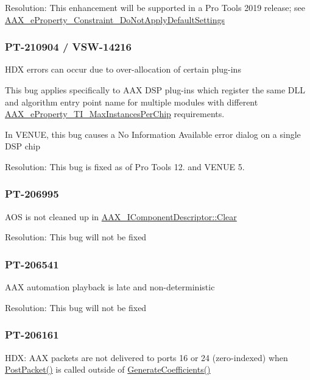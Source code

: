 Resolution\+: This enhancement will be supported in a Pro Tools 2019 release; see \mbox{\hyperlink{a00662_a13e384f22825afd3db6d68395b79ce0da80bb55dbba6cba01120eda8f86284eba}{A\+A\+X\+\_\+e\+Property\+\_\+\+Constraint\+\_\+\+Do\+Not\+Apply\+Default\+Settings}}\hypertarget{a00846_PT-210904}{}\subsubsection{P\+T-\/210904 / V\+S\+W-\/14216}\label{a00846_PT-210904}
H\+DX errors can occur due to over-\/allocation of certain plug-\/ins

This bug applies specifically to A\+AX D\+SP plug-\/ins which register the same D\+LL and algorithm entry point name for multiple modules with different \mbox{\hyperlink{a00662_a13e384f22825afd3db6d68395b79ce0da5b85e213113b7f0f7ee4bac4f5eaa59d}{A\+A\+X\+\_\+e\+Property\+\_\+\+T\+I\+\_\+\+Max\+Instances\+Per\+Chip}} requirements.

In V\+E\+N\+UE, this bug causes a \textquotesingle{}No Information Available\textquotesingle{} error dialog on a single D\+SP chip

Resolution\+: This bug is fixed as of Pro Tools 12. and V\+E\+N\+UE 5.\hypertarget{a00846_PT-206995}{}\subsubsection{P\+T-\/206995}\label{a00846_PT-206995}
A\+OS is not cleaned up in \mbox{\hyperlink{a01781_a0ba6941428a6e272f72a6fadb474394f}{A\+A\+X\+\_\+\+I\+Component\+Descriptor\+::\+Clear}}

Resolution\+: This bug will not be fixed\hypertarget{a00846_PT-206541}{}\subsubsection{P\+T-\/206541}\label{a00846_PT-206541}
A\+AX automation playback is late and non-\/deterministic

Resolution\+: This bug will not be fixed\hypertarget{a00846_PT-206161}{}\subsubsection{P\+T-\/206161}\label{a00846_PT-206161}
H\+DX\+: A\+AX packets are not delivered to ports 16 or 24 (zero-\/indexed) when \mbox{\hyperlink{a01789_ae5dd2b5925dbc181513bca1c4ac5e716}{Post\+Packet()}} is called outside of \mbox{\hyperlink{a01669_a083265b008921b6114ede387711694b7}{Generate\+Coefficients()}}

